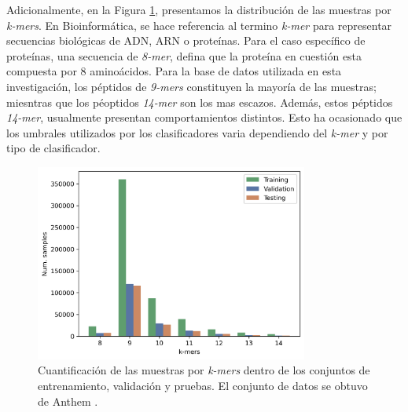 Adicionalmente, en la Figura \ref{fig:samples}, presentamos la distribución de las muestras por \textit{k-mers}. En Bioinformática, se hace referencia al termino \textit{k-mer} para representar secuencias biológicas de ADN, ARN o proteínas. Para el caso específico de proteínas, una secuencia de \textit{8-mer}, defina que la proteína en cuestión esta compuesta por 8 aminoácidos. Para la base de datos utilizada en esta investigación, los péptidos de \textit{9-mers} constituyen la mayoría de las muestras; miesntras que los péoptidos \textit{14-mer} son los mas escazos. Además, estos péptidos \textit{14-mer}, usualmente presentan comportamientos distintos. Esto ha ocasionado que los umbrales utilizados por los clasificadores varia dependiendo del \textit{k-mer} y por tipo de clasificador. 

\begin{figure}[H]
	\centering\includegraphics[width=0.8\textwidth]{../img/proposal/dataset_samples}
	\caption{
		Cuantificación de las muestras por \textit{k-mers} dentro de los conjuntos de entrenamiento, validación y pruebas. El conjunto de datos se obtuvo de Anthem \citep{mei2021anthem}.}
	\label{fig:samples}
\end{figure}



